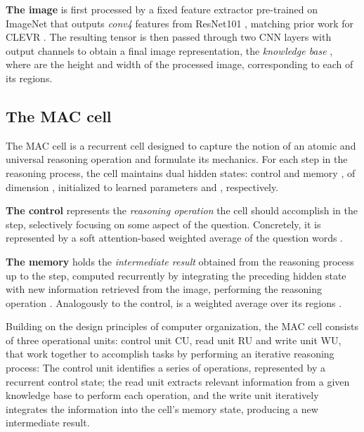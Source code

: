 \documentclass[fleqn]{article}
\begin{document}
\textbf{The image} is first processed by a fixed feature extractor pre-trained on ImageNet \citep{imagenet} that outputs \textit{conv4} features from ResNet101 \citep{imp1}, matching prior work for CLEVR \citep{nmn3,rn,film}. The resulting tensor is then passed through two CNN layers with  output channels to obtain a final image representation, the \textit{knowledge base} , where  are the height and width of the processed image, corresponding to each of its regions.

\subsection{The MAC cell}
\label{sec:MACcell}

The MAC cell is a recurrent cell designed to capture the notion of an atomic and universal reasoning operation and formulate its mechanics. For each step  in the reasoning process, the  cell maintains dual hidden states: control  and memory , of dimension , initialized to learned parameters  and , respectively.

\textbf{The control}  represents the \textit{reasoning operation} the cell should accomplish in the  step, selectively focusing on some aspect of the question. Concretely, it is represented by a soft attention-based weighted average of the question words .

\textbf{The memory}  holds the \textit{intermediate result} obtained from the reasoning process up to the  step, computed recurrently by integrating the preceding hidden state 
with new information  retrieved from the image, performing the  reasoning operation . Analogously to the control,  is  a weighted average over its regions .

Building on the design principles of computer organization, the MAC cell consists of three operational units: control unit CU, read unit RU and write unit WU, that work together to accomplish tasks by performing an iterative reasoning process: The control unit identifies a series of operations, represented by a recurrent control state; the read unit extracts relevant information from a given knowledge base to perform each operation, and the write unit iteratively integrates the information into the cell's memory state, producing a new intermediate result.
\end{document}
